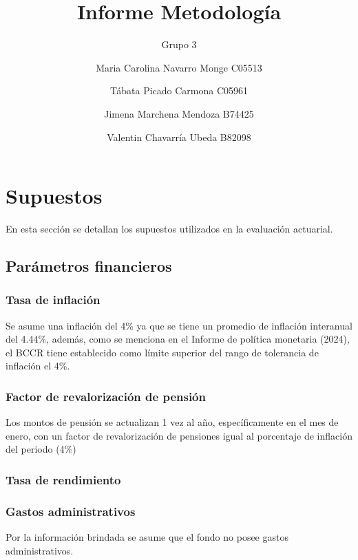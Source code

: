 \documentclass[
]{article}
\title{Informe Metodología}
\subtitle{Grupo 3}
\author{Maria Carolina Navarro Monge C05513 \and Tábata Picado Carmona
C05961 \and Jimena Marchena Mendoza B74425 \and Valentin Chavarría Ubeda
B82098}
\date{}
\begin{document}
\maketitle

{
\setcounter{tocdepth}{2}
\tableofcontents
}
\newpage

\section{Supuestos}\label{supuestos}

En esta sección se detallan los supuestos utilizados en la evaluación
actuarial.

\subsection{Parámetros financieros}\label{paruxe1metros-financieros}

\subsubsection{Tasa de inflación}\label{tasa-de-inflaciuxf3n}

Se asume una inflación del 4\% ya que se tiene un promedio de inflación
interanual del 4.44\%, además, como se menciona en el Informe de
política monetaria (2024), el BCCR tiene establecido como límite
superior del rango de tolerancia de inflación el 4\%.

\subsubsection{Factor de revalorización de
pensión}\label{factor-de-revalorizaciuxf3n-de-pensiuxf3n}

Los montos de pensión se actualizan 1 vez al año, específicamente en el
mes de enero, con un factor de revalorización de pensiones igual al
porcentaje de inflación del periodo (4\%)

\subsubsection{Tasa de rendimiento}\label{tasa-de-rendimiento}

\subsubsection{Gastos administrativos}\label{gastos-administrativos}

Por la información brindada se asume que el fondo no posee gastos
administrativos.
\end{document}
